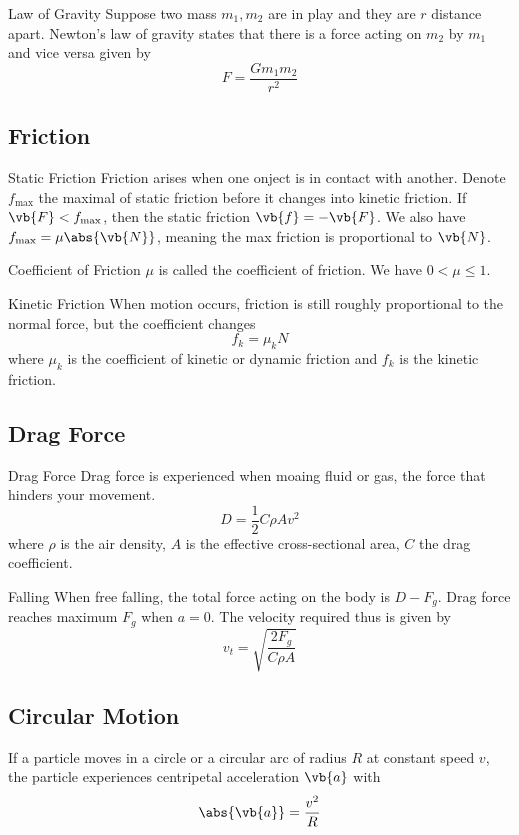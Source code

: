\documentclass[a4paper]{article}
\begin{document}
\begin{thm}{Law of Gravity}{} Suppose two mass $m_1,m_2$ are in play and they are $r$ distance apart. Newton's law of gravity states that there is a force acting on $m_2$ by $m_1$ and vice versa given by $$F=\frac{Gm_1m_2}{r^2}$$
\end{thm}

\subsection{Friction}
\begin{defn}{Static Friction}{} Friction arises when one onject is in contact with another. Denote $f_{\text{max}}$ the maximal of static friction before it changes into kinetic friction. If $\vb{F}<f_{\text{max}}$, then the static friction $\vb{f}=-\vb{F}$. We also have $f_{\text{max}}=\mu\abs{\vb{N}}$, meaning the max friction is proportional to $\vb{N}$. 
\end{defn}

\begin{defn}{Coefficient of Friction}{} $\mu$ is called the coefficient of friction. We have $0<\mu\leq 1$. 
\end{defn}

\begin{defn}{Kinetic Friction}{} When motion occurs, friction is still roughly proportional to the normal force, but the coefficient changes $$f_k=\mu_kN$$ where $\mu_k$ is the coefficient of kinetic or dynamic friction and $f_k$ is the kinetic friction. 
\end{defn}

\subsection{Drag Force}
\begin{defn}{Drag Force}{} Drag force is experienced when moaing fluid or gas, the force that hinders your movement. $$D=\frac{1}{2}C\rho Av^2$$ where $\rho$ is the air density, $A$ is the effective cross-sectional area, $C$ the drag coefficient. 
\end{defn}

\begin{thm}{Falling}{} When free falling, the total force acting on the body is $D-F_g$. Drag force reaches maximum $F_g$ when $a=0$. The velocity required thus is given by $$v_t=\sqrt{\frac{2F_g}{C\rho A}}$$
\end{thm}

\subsection{Circular Motion}
\begin{thm}{}{} If a particle moves in a circle or a circular arc of radius $R$ at constant speed $v$, the particle experiences centripetal acceleration $\vb{a}$ with $$\abs{\vb{a}}=\frac{v^2}{R}$$
\end{thm}
\end{document}

